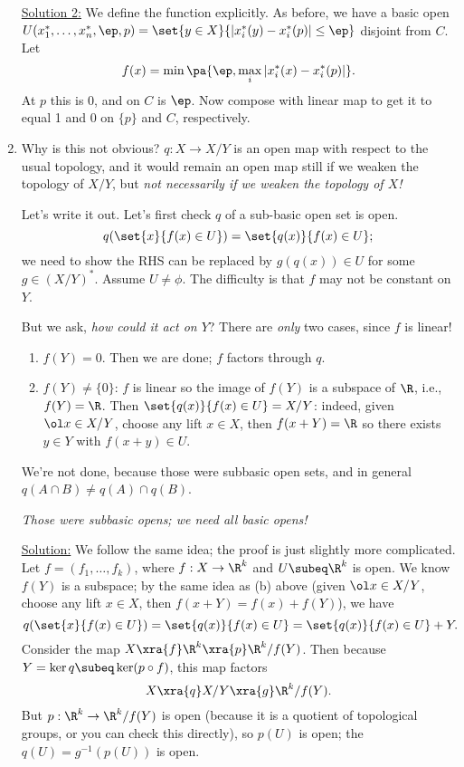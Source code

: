 \begin{enumerate}
\ul{Solution 2:} We define the function explicitly. As before, we have a basic open $U(x_1^*,\ldots, x_n^*,\ep,p)=\set{y\in X}{|x_i^*(y)-x_i^*(p)|\le \ep}$ disjoint from $C$. Let 
\[f(x)=\min\pa{\ep,\max_i|x_i^*(x)-x_i^*(p)|}.\] 
At $p$ this is 0, and on $C$ is $\ep$. Now compose with linear map to get it to equal 1 and 0 on $\{p\}$ and $C$, respectively.

\item Why is this not obvious? $q:X\to X/Y$ is an open map with respect to the usual topology, and it would remain an open map still if we weaken the topology of $X/Y$, but {\it not necessarily if we weaken the topology of $X$!}

Let's write it out. Let's first check $q$ of a sub-basic open set is open.
\[
q(\set{x}{f(x)\in U})=\set{q(x)}{f(x)\in U};
\]
we need to show the RHS can be replaced by $g(q(x))\in U$ for some $g\in (X/Y)^*$. Assume $U\ne \phi$. The difficulty is that $f$ may not be constant on $Y$.

But we ask, {\it how could it act on $Y$}? There are {\it only} two cases, since $f$ is linear!
\begin{enumerate}
\item
$f(Y)=0$. Then we are done; $f$ factors through $q$.
\item
$f(Y)\ne \{0\}$: $f$ is linear so the image of $f(Y)$ is a subspace of $\R$, i.e., $f(Y)=\R$. Then $\set{q(x)}{f(x)\in U}=X/Y$: indeed, given $\ol x\in X/Y$, choose any lift $x\in X$, then $f(x+Y)=\R$ so there exists $y\in Y$ with $f(x+y)\in U$.
\end{enumerate}

We're not done, because those were subbasic open sets, and in general $q(A\cap B)\ne q(A)\cap q(B)$. 

{\it Those were subbasic opens; we need all basic opens!}

\ul{Solution:} We follow the same idea; the proof is just slightly more complicated. Let $f=(f_1,\ldots, f_k)$, where $f:X\to \R^k$ and $U\subeq \R^k$ is open. We know $f(Y)$ is a subspace; by the same idea as (b) above (given $\ol x\in X/Y$, choose any lift $x\in X$, then $f(x+Y)=f(x)+f(Y)$), we have
\[
q(\set{x}{f(x)\in U})=\set{q(x)}{f(x)\in U}=\set{q(x)}{f(x)\in U}+Y.
\]
Consider the map $X\xra{f} \R^k\xra{p} \R^k/f(Y)$. Then because $Y=\ker q\subeq \ker (p\circ f)$, this map factors
\[
X\xra{q} X/Y\xra{g} \R^k/f(Y).
\]
But $p:\R^k\to \R^k/f(Y)$ is open (because it is a quotient of topological groups, or you can check this directly), so $p(U)$ is open; the $q(U)=g^{-1}(p(U))$ is open.


\end{enumerate}
